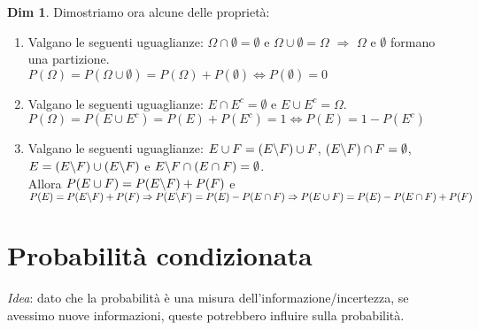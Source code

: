 \documentclass[12pt, a4paper]{report}
\theoremstyle{definition}
\newtheorem*{demonstration}{Dim}
\begin{document}
\begin{demonstration}
	Dimostriamo ora alcune delle proprietà:
	\begin{enumerate}
		\item Valgano le seguenti uguaglianze: \(\Omega\cap\emptyset = \emptyset\)
		e \(\Omega\cup\emptyset = \Omega\) $\Rightarrow$ $\Omega$ e $\emptyset$
		formano una partizione.\\
		\(P(\Omega)=P(\Omega\cup\emptyset)=P(\Omega)+P(\emptyset)\Leftrightarrow
		P(\emptyset)=0\)
		\item Valgano le seguenti uguaglianze: \(E\cap E^c=\emptyset\) e \(E\cup
		E^c=\Omega\).\\
		\(P(\Omega)=P(E\cup E^c)=P(E)+P(E^c)=1 \Leftrightarrow P(E)=1-P(E^c)\)
		\item Valgano le seguenti uguaglianze: \(E\cup F=(E\symbol{92}F)\cup F\),
		\((E\symbol{92}F)\cap F=\emptyset\), \(E=(E\symbol{92}F)\cup
		(E\symbol{92}F)\) e \(E\symbol{92}F\cap (E\cap F)=\emptyset\).\\
		Allora \(P(E\cup F)=P(E\symbol{92}F)+P(F)\) e \(P(E)=P(E\symbol{92}F)+P(F)
		\Rightarrow P(E\symbol{92}F)=P(E)-P(E\cap F)\Rightarrow P(E\cup F)=P(E)
		-P(E\cap F)+P(F)\)
	\end{enumerate}
\end{demonstration}

\section{Probabilità condizionata}
\emph{Idea}: dato che la probabilità è una misura dell'informazione/incertezza,
se avessimo nuove informazioni, queste potrebbero influire sulla probabilità.
\end{document}
